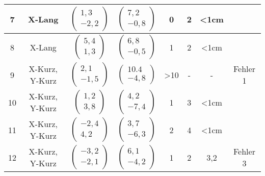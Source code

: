 \begin{center}
\begin{longtable}{|c|c|c|c|c|c|c|c|}
		\hline
		7 & X-Lang &  $\left(\begin{array}{c} 1,3 \\ -2,2\end{array}\right)$ & $\left(\begin{array}{c} 7,2 \\ -0,8\end{array}\right)$ & 0& 2& <1cm& \checkmark\\
		\hline
		8 & X-Lang &  $\left(\begin{array}{c} 5,4 \\ 1,3\end{array}\right)$ & $\left(\begin{array}{c} 6,8 \\ -0,5\end{array}\right)$ & 1& 2& <1cm& \checkmark\\
		\hline
		9 & X-Kurz, Y-Kurz &  $\left(\begin{array}{c} 2,1 \\ -1,5\end{array}\right)$ & $\left(\begin{array}{c} 10.4 \\ -4,8\end{array}\right)$ & >10& -& -& Fehler 1\\
		\hline
		10 & X-Kurz, Y-Kurz &  $\left(\begin{array}{c} 1,2 \\ 3,8\end{array}\right)$ & $\left(\begin{array}{c} 4,2 \\ -7,4\end{array}\right)$ & 1& 3& <1cm& \checkmark\\
		\hline
		11 & X-Kurz, Y-Kurz &  $\left(\begin{array}{c} -2,4 \\ 4,2\end{array}\right)$ & $\left(\begin{array}{c} 3,7 \\ -6,3\end{array}\right)$ & 2& 4& <1cm& \checkmark\\
		\hline
		12 & X-Kurz, Y-Kurz &  $\left(\begin{array}{c} -3,2 \\ -2,1\end{array}\right)$ & $\left(\begin{array}{c} 6,1 \\ -4,2\end{array}\right)$ & 1& 2& 3,2& Fehler 3\\

\end{longtable}
\end{center}
